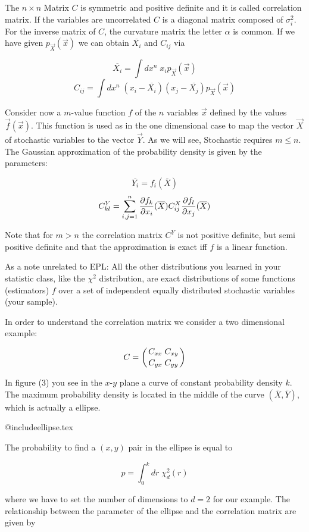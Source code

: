 The $n\times n$ Matrix $C$ is symmetric and positive definite and it is called
correlation matrix. 
If the variables are uncorrelated $C$ is a diagonal matrix composed of
$\sigma_i^2$.
For the inverse matrix of $C$, the curvature matrix the letter
$\alpha$ is common.
If we have given $p_{\vec{X}}(\vec{x})$ we can
obtain $\overline{X_i}$ and $C_{ij}$ via

$$ \overline{X_i}=\int dx^n \; x_i p_{\vec{X}}(\vec{x}) $$
$$ C_{ij} = \int dx^n \;
      \left(x_i-\overline{X_i}\right)\left(x_j-\overline{X_j}\right)
    p_{\vec{X}}(\vec{x}) $$

Consider now a $m$-value function $f$ of the $n$ variables $\vec{x}$
defined by the values $\vec{f}(\vec{x})$. 
This function is used as in the one dimensional case to map the vector
$\vec{X}$ of stochastic variables to the vector $\vec{Y}$.
As we will see, Stochastic requires $m\le n$.
The Gaussian approximation of the probability density is given by the
parameters:

$$ \overline{Y_i}=f_i(\overline{X})$$
$$  C^{Y}_{kl} = \sum_{i,j=1}^{n} 
     {\partial f_k \over \partial x_i}(\overline{X})
        C^{X}_{ij}
     {\partial f_l \over \partial x_j}(\overline{X}) $$

Note that for $m>n$ the correlation matrix $C^{Y}$ is not positive
definite, but semi positive definite and that the approximation is
exact iff $f$ is a linear function.

As a note unrelated to EPL: All the other distributions you learned in
your statistic class, like the $\chi^2$ distribution, are exact
distributions of some functions (estimators) $f$ over a set of
independent equally distributed stochastic variables (your sample).

In order to understand the correlation matrix we consider a two
dimensional example:
  
$$ C=\left( C_{xx} \; C_{xy} \atop C_{yx} \; C_{yy} \right) $$ 

In figure (3) you see in the $x$-$y$ plane a curve of constant
probability density $k$. The maximum probability density is located in the 
middle of the curve $(\overline{X},\overline{Y})$, which is actually a 
ellipse. 

@include{ellipse.tex}

The probability to find a $(x,y)$ pair in the ellipse is equal to

$$ p=\int_{0}^{k} dr \; \chi_d^2(r) $$

where we have to set the number of dimensions to $d=2$ for our
example. 
The relationship between the parameter of the ellipse and the correlation
matrix are given by

